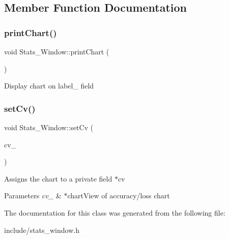 \subsection{Member Function Documentation}
\mbox{\label{class_stats___window_a1bdd2d19e64d9c316754e3f667ebbecb}} 
\subsubsection{\texorpdfstring{print\+Chart()}{printChart()}}
{\footnotesize\ttfamily void Stats\+\_\+\+Window\+::print\+Chart (\begin{DoxyParamCaption}{ }\end{DoxyParamCaption})}

Display chart on label\+\_ field \mbox{\label{class_stats___window_aa08614ebaf747b305a39bb790d2a96bd}} 
\subsubsection{\texorpdfstring{set\+Cv()}{setCv()}}
{\footnotesize\ttfamily void Stats\+\_\+\+Window\+::set\+Cv (\begin{DoxyParamCaption}\item[{Q\+Chart\+View $\ast$}]{cv\+\_\+ }\end{DoxyParamCaption})}

Assigns the chart to a private field $\ast$cv 
\begin{DoxyParams}{Parameters}
{\em cv\+\_\+} & $\ast$chart\+View of accuracy/loss chart \\
\hline
\end{DoxyParams}


The documentation for this class was generated from the following file\+:\begin{DoxyCompactItemize}
\item 
include/stats\+\_\+window.\+h\end{DoxyCompactItemize}

